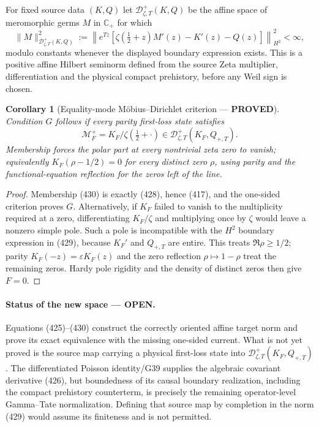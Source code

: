 \documentclass[11pt]{article}
\newtheorem{corollary}[theorem]{Corollary}
\newcommand{\PROVED}{\textcolor{green!45!black}{\textbf{PROVED}}}
\newcommand{\OPEN}{\textcolor{red!70!black}{\textbf{OPEN}}}
\begin{document}
\begin{definition}
For fixed source data $(K,Q)$ let
$\mathscr D_{\zeta,T}^+(K,Q)$ be the affine space of meromorphic germs
$M$ in $\mathbb C_+$ for which
\begin{equation}
 \|M\|_{\mathscr D_{\zeta,T}^+(K,Q)}^2
 :=\left\|e^{Tz}\left[
 \zeta(\tfrac12+z)M'(z)-K'(z)-Q(z)\right]\right\|_{H^2}^2
 <\infty,                                            \tag{429}
\end{equation}
modulo constants whenever the displayed boundary expression exists.  This
is a positive affine Hilbert seminorm defined from the source Zeta
multiplier, differentiation and the physical compact prehistory, before any
Weil sign is chosen.
\end{definition}

\begin{corollary}[Equality-mode M\"obius--Dirichlet criterion --- \PROVED]
Condition $G$ follows if every parity first-loss state satisfies
\begin{equation}
 \mathcal M_F^+=K_F/\zeta(\tfrac12+\cdot)
 \in\mathscr D_{\zeta,T}^+(K_F,Q_{+,T}).             \tag{430}
\end{equation}
Membership forces the polar part at every nontrivial zeta zero to vanish;
equivalently $K_F(\rho-1/2)=0$ for every distinct zero $\rho$, using parity
and the functional-equation reflection for the zeros left of the line.
\end{corollary}

\begin{proof}
Membership (430) is exactly (428), hence (417), and the one-sided criterion proves
$G$.  Alternatively, if $K_F$ failed to vanish to the multiplicity required
at a zero, differentiating $K_F/\zeta$ and multiplying once by $\zeta$
would leave a nonzero simple pole.  Such a pole is incompatible with the
$H^2$ boundary expression in (429), because $K_F'$ and $Q_{+,T}$ are
entire.  This treats $\Re\rho\ge1/2$; parity
$K_F(-z)=\varepsilon K_F(z)$ and the zero reflection
$\rho\mapsto1-\rho$ treat the remaining zeros.  Hardy pole rigidity and the density of distinct
zeros then give $F=0$.
\end{proof}

\paragraph{Status of the new space --- \OPEN.}
Equations (425)--(430) construct the correctly oriented affine target norm
and prove its exact equivalence with the missing one-sided current.  What is
not yet proved is the source map carrying a physical first-loss state into
$\mathscr D_{\zeta,T}^+(K_F,Q_{+,T})$.  The differentiated Poisson
identity/G39 supplies the algebraic covariant derivative (426), but
boundedness of its causal boundary realization, including the compact
prehistory counterterm, is precisely the remaining operator-level
Gamma--Tate normalization.  Defining that source map by completion in the
norm (429) would assume its finiteness and is not permitted.
\end{document}
